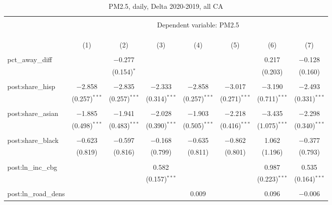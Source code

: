 
\begin{table}[!htbp] \centering 
  \caption{PM2.5, daily, Delta 2020-2019, all CA} 
  \label{} 
\begin{tabular}{@{\extracolsep{5pt}}lccccccc} 
\\[-1.8ex]\hline 
\hline \\[-1.8ex] 
 & \multicolumn{7}{c}{Dependent variable: PM2.5} \\ 
\cline{2-8} 
\\[-1.8ex] & \multicolumn{7}{c}{} \\ 
\\[-1.8ex] & (1) & (2) & (3) & (4) & (5) & (6) & (7)\\ 
\hline \\[-1.8ex] 
 pct\_away\_diff &  & $-$0.277 &  &  &  & 0.217 & $-$0.128 \\ 
  &  & (0.154)$^{*}$ &  &  &  & (0.203) & (0.160) \\ 
  & & & & & & & \\ 
 post:share\_hisp & $-$2.858 & $-$2.835 & $-$2.333 & $-$2.858 & $-$3.017 & $-$3.190 & $-$2.493 \\ 
  & (0.257)$^{***}$ & (0.257)$^{***}$ & (0.314)$^{***}$ & (0.257)$^{***}$ & (0.271)$^{***}$ & (0.711)$^{***}$ & (0.331)$^{***}$ \\ 
  & & & & & & & \\ 
 post:share\_asian & $-$1.885 & $-$1.941 & $-$2.028 & $-$1.903 & $-$2.218 & $-$3.435 & $-$2.298 \\ 
  & (0.498)$^{***}$ & (0.483)$^{***}$ & (0.390)$^{***}$ & (0.505)$^{***}$ & (0.416)$^{***}$ & (1.075)$^{***}$ & (0.340)$^{***}$ \\ 
  & & & & & & & \\ 
 post:share\_black & $-$0.623 & $-$0.597 & $-$0.168 & $-$0.635 & $-$0.862 & 1.062 & $-$0.377 \\ 
  & (0.819) & (0.816) & (0.799) & (0.811) & (0.801) & (1.196) & (0.793) \\ 
  & & & & & & & \\ 
 post:ln\_inc\_cbg &  &  & 0.582 &  &  & 0.987 & 0.535 \\ 
  &  &  & (0.157)$^{***}$ &  &  & (0.223)$^{***}$ & (0.164)$^{***}$ \\ 
  & & & & & & & \\ 
 post:ln\_road\_dens &  &  &  & 0.009 &  & 0.096 & $-$0.006 \\ 

\end{tabular}
\end{table}
